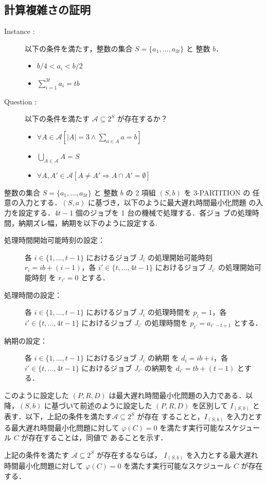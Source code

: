 \documentclass[12pt]{optlab-bachelor}
\begin{document}
\subsection{計算複雑さの証明}
\begin{description}
  \item[Instance : ] 以下の条件を満たす，整数の集合 $S = \{a_1,\ldots,a_{3t}\}$ と 整数 $b$．
  \begin{itemize}
    \item $b/4 < a_i < b/2$
    \item $\displaystyle \sum_{i = 1}^{3t}a_i = tb$
  \end{itemize}
  \item[Question : ] 以下の条件を満たす $\mathcal{A} \subseteq 2^S$ が存在するか？
  \begin{itemize}
    \item $\forall A \in \mathcal{A}[|A| = 3 \land \sum_{a \in A} a = b]$
    \item $\bigcup_{A \in \mathcal{A}} A = S$
    \item $\forall A, A' \in \mathcal{A}[A \neq A' \Rightarrow A \cap A' = \emptyset]$
  \end{itemize}
\end{description}

整数の集合 $S = \{a_1,\ldots,a_{3t}\}$ と 整数 $b$ の 2 項組 $(S,b)$ を 3-PARTITION の
任意の入力とする．$(S,a)$ に基づき，以下のように最大遅れ時間最小化問題
の入力を設定する．$4t - 1$ 個のジョブを 1 台の機械で処理する．各゙ジョ
ブの処理時間，納期ズレ幅，納期を以下のように設定する.

\begin{description}
  \item[処理時間開始可能時刻の設定：] 各 $i \in \{1,\ldots,t - 1\}$ におけるジョブ $J_i$ の処理開始可能時刻
  $r_i = ib + (i - 1)$，各 $i' \in \{t,\ldots,4t - 1\}$ におけるジョブ $J_{i'}$ の処理開始可能時刻
  を $r_{i'} = 0$ とする．
  \item[処理時間の設定：] 各 $i \in \{1,\ldots,t - 1\}$ におけるジョブ $J_i$ の処理時間を $p_i = 1$，各 $i' \in \{t,\ldots,4t - 1\}$ におけるジョブ $J_{i'}$ の処理時間を $p_{i'} = a_{i' - t + 1}$ とする．
  \item[納期の設定：] 各 $i \in \{1,\ldots,t - 1\}$ におけるジョブ $J_i$ の納期
  を $d_i = ib + i$，各 $i' \in \{t,\ldots,4t - 1\}$ におけるジョブ $J_{i'}$ の納期を $d_{i'} = tb + (t - 1)$ とする．
\end{description}

このように設定した $(P,R,D)$ は最大遅れ時間最小化問題の入力である．以
降，$(S,b)$ に基づいて前述のように設定した $(P,R,D)$ を区別して
$I_{(S,b)}$ と表す．以下，上記の条件を満たす$\mathcal{A} \subseteq 2^S$ が存在
することと，$I_{(S,b)}$ を入力とする最大遅れ時間最小化問題に対して
$\varphi(C) =  0$
を満たす実行可能なスケジュール $C$ が存在することは，同値で
あることを示す．
\begin{lemma}\label{l_3}
  上記の条件を満たす $\mathcal{A} \subseteq 2^S$ が存在するならば，
  $I_{(S,b)}$ を入力とする最大遅れ時間最小化問題に対して $\varphi(C) =
  0$ を満たす実行可能なスケジュール $C$ が存在する．
\end{lemma}
\end{document}
